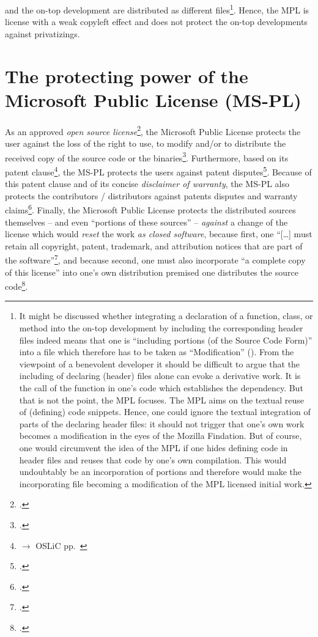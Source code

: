 and the on-top development are distributed as different files\footnote{It might
be discussed whether integrating a declaration of a function, class, or method
into the on-top development by including the corresponding header files indeed
means that one is \enquote{including portions (of the Source Code Form)} into a
file which therefore has to be taken as \enquote{Modification}
(\cite[cf.][\nopage wp.\ §1.4]{Mpl11MozFoundation2013a}). From the viewpoint of
a benevolent developer it should be difficult to argue that the including of
declaring (header) files alone can evoke a derivative work. It is the call of
the function in one's code which establishes the dependency. But that is not the
point, the MPL focuses. The MPL aims on the textual reuse of (defining) code
snippets. Hence, one could ignore the textual integration of parts of the
declaring header files: it should not trigger that one's own work becomes a
modification in the eyes of the Mozilla Findation. But of course, one would
circumvent the idea of the MPL if one hides defining code in header files and
reuses that code by one's own compilation. This would undoubtably be an
incorporation of portions and therefore would make the incorporating file
becoming a modification of the MPL licensed initial work. }. Hence, the MPL is
license with a weak copyleft effect and does not protect the on-top developments
against privatizings.

\section{The protecting power of the Microsoft Public License (MS-PL)}
\label{sec:ProtectingPowerOfMspl}

As an approved \emph{open source license}\footcite[cf.][\nopage wp]{OSI2012b},
the Microsoft Public License protects the user against the loss of the right to
use, to modify and/or to distribute the received copy of the source code or the
binaries\footcite[cf.][\nopage wp. 
§2]{MsplOsiLicense2013a}. Furthermore, based on its patent
clause\footnote{$\rightarrow$ OSLiC pp.\ \pageref{subsec:MsplPatentClause}}, the
MS-PL protects the users against patent disputes\footcite[cf.][\nopage wp. 
§2.B and §3.B]{MsplOsiLicense2013a}. Because of this patent clause and of its
concise \emph{disclaimer of warranty}, the MS-PL also protects the contributors
/ distributors against patents disputes and warranty
claims\footcite[cf.][\nopage wp. §2B, §3B, §3D]{MsplOsiLicense2013a}.
Finally, the Microsoft Public License protects the distributed sources
themselves -- and even \enquote{portions of these sources} -- \emph{against} a
change of the license which would \emph{reset} the work \emph{as closed
software}, because first, one \enquote{[\ldots] must retain all copyright,
patent, trademark, and attribution notices that are part of the
software}\footcite[cf.][\nopage wp. §3C]{MsplOsiLicense2013a}, and because
second, one must also incorporate \enquote{a complete copy of this license} into
one's own distribution premised one distributes the source
code\footcite[cf.][\nopage wp. §3D]{MsplOsiLicense2013a}.

